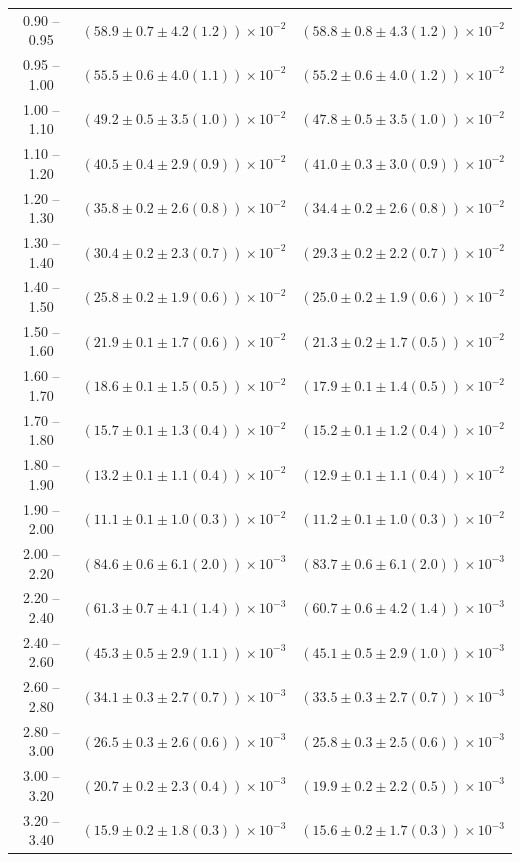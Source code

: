 \begin{table}
\begin{center}
\begin{tabular}{ c | c c }
0.90 -- 0.95 & $(58.9\pm0.7\pm4.2(1.2))\times10^{-2}$ & $(58.8\pm0.8\pm4.3(1.2))\times10^{-2}$ \\ 
0.95 -- 1.00 & $(55.5\pm0.6\pm4.0(1.1))\times10^{-2}$ & $(55.2\pm0.6\pm4.0(1.2))\times10^{-2}$ \\ 
1.00 -- 1.10 & $(49.2\pm0.5\pm3.5(1.0))\times10^{-2}$ & $(47.8\pm0.5\pm3.5(1.0))\times10^{-2}$ \\ 
1.10 -- 1.20 & $(40.5\pm0.4\pm2.9(0.9))\times10^{-2}$ & $(41.0\pm0.3\pm3.0(0.9))\times10^{-2}$ \\ 
1.20 -- 1.30 & $(35.8\pm0.2\pm2.6(0.8))\times10^{-2}$ & $(34.4\pm0.2\pm2.6(0.8))\times10^{-2}$ \\ 
1.30 -- 1.40 & $(30.4\pm0.2\pm2.3(0.7))\times10^{-2}$ & $(29.3\pm0.2\pm2.2(0.7))\times10^{-2}$ \\ 
1.40 -- 1.50 & $(25.8\pm0.2\pm1.9(0.6))\times10^{-2}$ & $(25.0\pm0.2\pm1.9(0.6))\times10^{-2}$ \\ 
1.50 -- 1.60 & $(21.9\pm0.1\pm1.7(0.6))\times10^{-2}$ & $(21.3\pm0.2\pm1.7(0.5))\times10^{-2}$ \\ 
1.60 -- 1.70 & $(18.6\pm0.1\pm1.5(0.5))\times10^{-2}$ & $(17.9\pm0.1\pm1.4(0.5))\times10^{-2}$ \\ 
1.70 -- 1.80 & $(15.7\pm0.1\pm1.3(0.4))\times10^{-2}$ & $(15.2\pm0.1\pm1.2(0.4))\times10^{-2}$ \\ 
1.80 -- 1.90 & $(13.2\pm0.1\pm1.1(0.4))\times10^{-2}$ & $(12.9\pm0.1\pm1.1(0.4))\times10^{-2}$ \\ 
1.90 -- 2.00 & $(11.1\pm0.1\pm1.0(0.3))\times10^{-2}$ & $(11.2\pm0.1\pm1.0(0.3))\times10^{-2}$ \\ 
2.00 -- 2.20 & $(84.6\pm0.6\pm6.1(2.0))\times10^{-3}$ & $(83.7\pm0.6\pm6.1(2.0))\times10^{-3}$ \\ 
2.20 -- 2.40 & $(61.3\pm0.7\pm4.1(1.4))\times10^{-3}$ & $(60.7\pm0.6\pm4.2(1.4))\times10^{-3}$ \\ 
2.40 -- 2.60 & $(45.3\pm0.5\pm2.9(1.1))\times10^{-3}$ & $(45.1\pm0.5\pm2.9(1.0))\times10^{-3}$ \\ 
2.60 -- 2.80 & $(34.1\pm0.3\pm2.7(0.7))\times10^{-3}$ & $(33.5\pm0.3\pm2.7(0.7))\times10^{-3}$ \\ 
2.80 -- 3.00 & $(26.5\pm0.3\pm2.6(0.6))\times10^{-3}$ & $(25.8\pm0.3\pm2.5(0.6))\times10^{-3}$ \\ 
3.00 -- 3.20 & $(20.7\pm0.2\pm2.3(0.4))\times10^{-3}$ & $(19.9\pm0.2\pm2.2(0.5))\times10^{-3}$ \\ 
3.20 -- 3.40 & $(15.9\pm0.2\pm1.8(0.3))\times10^{-3}$ & $(15.6\pm0.2\pm1.7(0.3))\times10^{-3}$ \\ 

\end{tabular}
\end{center}
\end{table}
